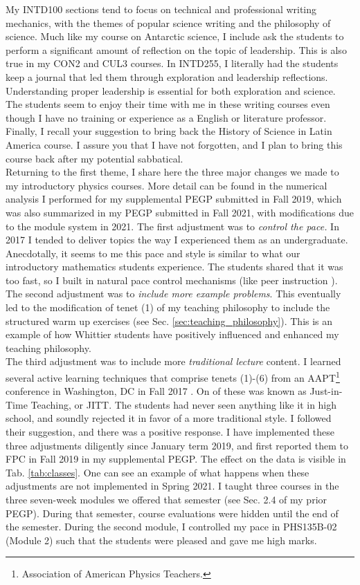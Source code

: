 \documentclass[../../../main.tex]{subfiles}
\begin{document}
My INTD100 sections tend to focus on technical and professional writing mechanics, with the themes of popular science writing and the philosophy of science.  Much like my course on Antarctic science, I include ask the students to perform a significant amount of reflection on the topic of leadership.  This is also true in my CON2 and CUL3 courses.  In INTD255, I literally had the students keep a journal that led them through exploration and leadership reflections.  Understanding proper leadership is essential for both exploration and science.  The students seem to enjoy their time with me in these writing courses even though I have no training or experience as a English or literature professor.  Finally, I recall your suggestion to bring back the History of Science in Latin America course.  I assure you that I have not forgotten, and I plan to bring this course back after my potential sabbatical.
\\
\vspace{0.25cm}
Returning to the first theme, I share here the three major changes we made to my introductory physics courses.  More detail can be found in the numerical analysis I performed for my supplemental PEGP submitted in Fall 2019, which was also summarized in my PEGP submitted in Fall 2021, with modifications due to the module system in 2021.  The first adjustment was to \textit{control the pace.}  In 2017 I tended to deliver topics the way I experienced them as an undergraduate.  Anecdotally, it seems to me this pace and style is similar to what our introductory mathematics students experience.  The students shared that it was too fast, so I built in natural pace control mechanisms (like peer instruction \cite{mazur2013peer}).  The second adjustment was to \textit{include more example problems}.  This eventually led to the modification of tenet (1) of my teaching philosophy to include the structured warm up exercises (see Sec. \ref{sec:teaching_philosophy}).  This is an example of how Whittier students have positively influenced and enhanced my teaching philosophy.
\\
\vspace{0.25cm}
The third adjustment was to include more \textit{traditional lecture} content.  I learned several active learning techniques that comprise tenets (1)-(6) from an AAPT\footnote{Association of American Physics Teachers.} conference in Washington, DC in Fall 2017 \cite{AAPTPI}.  On of these was known as Just-in-Time Teaching, or JITT.  The students had never seen anything like it in high school, and soundly rejected it in favor of a more traditional style.  I followed their suggestion, and there was a positive response.  I have implemented these three adjustments diligently since January term 2019, and first reported them to FPC in Fall 2019 in my supplemental PEGP.  The effect on the data is visible in Tab. \ref{tab:classes}.  One can see an example of what happens when these adjustments are not implemented in Spring 2021.  I taught three courses in the three seven-week modules we offered that semester (see Sec. 2.4 of my prior PEGP).  During that semester, course evaluations were hidden until the end of the semester.  During the second module, I controlled my pace in PHS135B-02 (Module 2) such that the students were pleased and gave me high marks.
\end{document}
